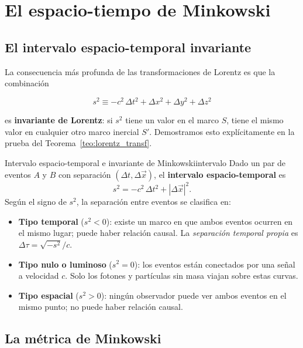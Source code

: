 \section{El espacio-tiempo de Minkowski}

\subsection{El intervalo espacio-temporal invariante}

La consecuencia más profunda de las transformaciones de Lorentz es que la combinación

\begin{equation}
  s^2 \equiv -c^2\,\Delta t^2 + \Delta x^2 + \Delta y^2 + \Delta z^2
  \label{eq:intervalo}
\end{equation}

es \textbf{invariante de Lorentz}: si $s^2$ tiene un valor en el marco $S$, tiene el mismo valor en cualquier otro marco inercial $S'$. Demostramos esto explícitamente en la prueba del Teorema~\ref{teo:lorentz_transf}.

\begin{definicion}{Intervalo espacio-temporal e invariante de Minkowski}{intervalo}
Dado un par de eventos $A$ y $B$ con separación $(\Delta t, \Delta\vec{x})$, el \textbf{intervalo espacio-temporal} es
\[
  s^2 = -c^2\,\Delta t^2 + |\Delta\vec{x}|^2.
\]
Según el signo de $s^2$, la separación entre eventos se clasifica en:
\begin{itemize}[leftmargin=2em]
  \item \textbf{Tipo temporal} ($s^2 < 0$): existe un marco en que ambos eventos ocurren en el mismo lugar; puede haber relación causal. La \emph{separación temporal propia} es $\Delta\tau = \sqrt{-s^2}/c$.
  \item \textbf{Tipo nulo o luminoso} ($s^2 = 0$): los eventos están conectados por una señal a velocidad $c$. Solo los fotones y partículas sin masa viajan sobre estas curvas.
  \item \textbf{Tipo espacial} ($s^2 > 0$): ningún observador puede ver ambos eventos en el mismo punto; no puede haber relación causal.
\end{itemize}
\end{definicion}

\subsection{La métrica de Minkowski}

